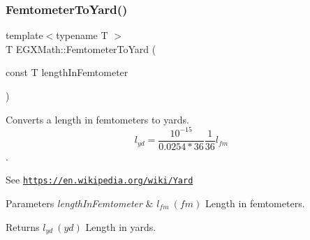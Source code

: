 \subsubsection{\texorpdfstring{Femtometer\+To\+Yard()}{FemtometerToYard()}}
{\footnotesize\ttfamily template$<$typename T $>$ \\
T E\+G\+X\+Math\+::\+Femtometer\+To\+Yard (\begin{DoxyParamCaption}\item[{const T}]{length\+In\+Femtometer }\end{DoxyParamCaption})}



Converts a length in femtometers to yards. \[ l_{yd}= \frac{10^{-15}}{0.0254 * 36} \frac{1}{36} l_{fm} \]. 

See \href{https://en.wikipedia.org/wiki/Yard}{\tt https\+://en.\+wikipedia.\+org/wiki/\+Yard} 
\begin{DoxyParams}{Parameters}
{\em length\+In\+Femtometer} & $ l_{fm}\ (fm)$ Length in femtometers. \\
\hline
\end{DoxyParams}
\begin{DoxyReturn}{Returns}
$ l_{yd}\ (yd)$ Length in yards. 
\end{DoxyReturn}
